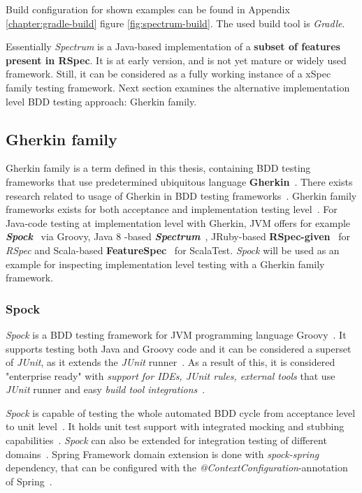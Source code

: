     Build configuration for shown examples can be found in Appendix \ref{chapter:gradle-build} figure \ref{fig:spectrum-build}.
    The used build tool is \textit{Gradle}.

    Essentially \textit{Spectrum} is a Java-based implementation of a \textbf{subset of features present in RSpec}. It is at early version,
    and is not yet mature or widely used framework. Still, it can be considered as a fully working instance of a xSpec family
    testing framework. Next section examines the alternative implementation level BDD testing approach: Gherkin family.


    \subsection{Gherkin family}
    Gherkin family is a term defined in this thesis, containing BDD testing frameworks that use predetermined ubiquitous
    language \textbf{Gherkin}~\cite{gherkin}. There exists research related to usage of Gherkin in BDD testing frameworks~\cite{okolnychyi2016study}.
    Gherkin family frameworks exists for both acceptance and implementation testing level~\cite{okolnychyi2016study}. For Java-code testing at
    implementation level with Gherkin, JVM offers for example \textbf{\textit{Spock}}~\cite{spock} via Groovy, Java 8 -based \textbf{\textit{Spectrum}}~\cite{spectrum},
    JRuby-based \textbf{RSpec-given}~\cite{rspec-given} for \textit{RSpec} and Scala-based \textbf{FeatureSpec}~\cite{featurespec} for ScalaTest.
    \textit{Spock} will be used as an example for inspecting implementation level testing with a Gherkin family framework.

    \subsubsection{Spock}
    \textit{Spock} is a BDD testing framework for JVM programming language Groovy~\cite{kapelonis2016java}. It supports
    testing both Java and Groovy code and it can be considered a superset of \textit{JUnit}, as it extends the \textit{JUnit} runner~\cite{spock}.
    As a result of this, it is considered "enterprise ready" with \textit{support for IDEs, \textit{JUnit} rules, external tools} that use
    \textit{JUnit} runner and easy \textit{build tool integrations}~\cite{kapelonis2016java}.

    \textit{Spock} is capable of testing the whole automated BDD cycle from acceptance level to unit level~\cite{kapelonis2016java}.
    It holds unit test support with integrated mocking and stubbing capabilities~\cite{spock}.
    \textit{Spock} can also be extended for integration testing of different domains~\cite{kapelonis2016java}.
    Spring Framework domain extension is done with \textit{spock-spring} dependency, that can be configured with
    the \textit{@ContextConfiguration}-annotation of Spring~\cite{springintegration}.

